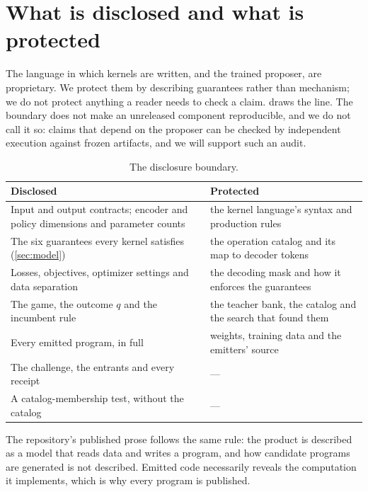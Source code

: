 \section{What is disclosed and what is protected}
\label{app:disclosure}

The language in which kernels are written, and the trained proposer, are proprietary. We protect them
by describing guarantees rather than mechanism; we do not protect anything a reader needs to check a
claim.  draws the line. The boundary does not make an unreleased component
reproducible, and we do not call it so: claims that depend on the proposer can be checked by
independent execution against frozen artifacts, and we will support such an audit.

\begin{table}[h]
\caption{The disclosure boundary.}
\label{tab:disclosure}
\centering\sffamily\footnotesize\lining
\begin{tabularx}{\linewidth}{@{}LL@{}}
\toprule
Disclosed & Protected \\
\midrule
Input and output contracts; encoder and policy dimensions and parameter counts & the kernel language's syntax and production rules \\
The six guarantees every kernel satisfies (\cref{sec:model}) & the operation catalog and its map to decoder tokens \\
Losses, objectives, optimizer settings and data separation & the decoding mask and how it enforces the guarantees \\
The game, the outcome $q$ and the incumbent rule & the teacher bank, the catalog and the search that found them \\
Every emitted program, in full & weights, training data and the emitters' source \\
The challenge, the entrants and every receipt & --- \\
A catalog-membership test, without the catalog & --- \\
\bottomrule
\end{tabularx}
\end{table}

The repository's published prose follows the same rule: the product is described as a model that reads
data and writes a program, and how candidate programs are generated is not described. Emitted code
necessarily reveals the computation it implements, which is why every program is published.
